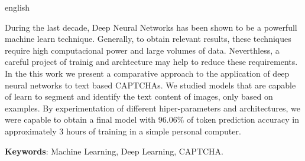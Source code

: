 \begin{resumo}[Abstract]
 \begin{otherlanguage*}{english}
  
During the last decade, Deep Neural Networks has been shown to be a powerfull machine learn technique. Generally, to obtain relevant results, these techniques require high computacional power and large volumes of data. Neverthless, a careful project of trainig and archtecture may help to reduce these requirements. In the this work we present a comparative approach to the application of deep neural networks to text based CAPTCHAs. We studied models that are capable of learn to segment and identify the text content of images, only based on examples. By experimentation of different hiper-parameters and architectures, we were capable to obtain a final model with $96.06\%$ of token prediction accuracy in approximately 3 hours of training in a simple personal computer.
 
   \vspace{\onelineskip}
 
   \noindent
   \textbf{Keywords}: Machine Learning, Deep Learning, CAPTCHA.
 \end{otherlanguage*}
\end{resumo}